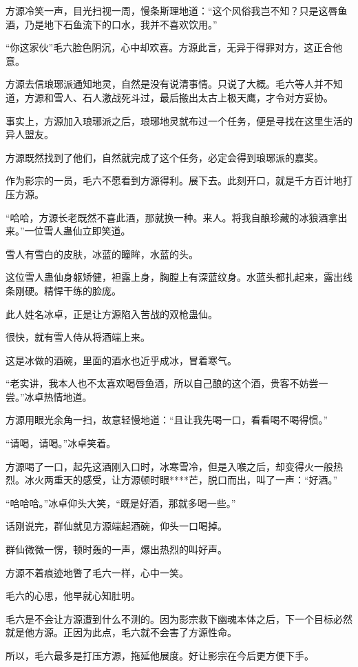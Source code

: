 \begin{this_body}
方源冷笑一声，目光扫视一周，慢条斯理地道：“这个风俗我岂不知？只是这唇鱼酒，乃是地下石鱼流下的口水，我并不喜欢饮用。”

“你这家伙”毛六脸色阴沉，心中却欢喜。方源此言，无异于得罪对方，这正合他意。

方源去信琅琊派通知地灵，自然是没有说清事情。只说了大概。毛六等人并不知道，方源和雪人、石人激战死斗过，最后搬出太古上极天鹰，才令对方妥协。

事实上，方源加入琅琊派之后，琅琊地灵就布过一个任务，便是寻找在这里生活的异人盟友。

方源既然找到了他们，自然就完成了这个任务，必定会得到琅琊派的嘉奖。

作为影宗的一员，毛六不愿看到方源得利。展下去。此刻开口，就是千方百计地打压方源。

“哈哈，方源长老既然不喜此酒，那就换一种。来人。将我自酿珍藏的冰狼酒拿出来。”一位雪人蛊仙立即笑道。

雪人有雪白的皮肤，冰蓝的瞳眸，水蓝的头。

这位雪人蛊仙身躯矫健，袒露上身，胸膛上有深蓝纹身。水蓝头都扎起来，露出线条刚硬。精悍干练的脸庞。

此人姓名冰卓，正是让方源陷入苦战的双枪蛊仙。

很快，就有雪人侍从将酒端上来。

这是冰做的酒碗，里面的酒水也近乎成冰，冒着寒气。

“老实讲，我本人也不太喜欢喝唇鱼酒，所以自己酿的这个酒，贵客不妨尝一尝。”冰卓热情地道。

方源用眼光余角一扫，故意轻慢地道：“且让我先喝一口，看看喝不喝得惯。”

“请喝，请喝。”冰卓笑着。

方源喝了一口，起先这酒刚入口时，冰寒雪冷，但是入喉之后，却变得火一般热烈。冰火两重天的感受，让方源顿时眼****芒，脱口而出，叫了一声：“好酒。”

“哈哈哈。”冰卓仰头大笑，“既是好酒，那就多喝一些。”

话刚说完，群仙就见方源端起酒碗，仰头一口喝掉。

群仙微微一愣，顿时轰的一声，爆出热烈的叫好声。

方源不着痕迹地瞥了毛六一样，心中一笑。

毛六的心思，他早就心知肚明。

毛六是不会让方源遭到什么不测的。因为影宗救下幽魂本体之后，下一个目标必然就是他方源。正因为此点，毛六就不会害了方源性命。

所以，毛六最多是打压方源，拖延他展度。好让影宗在今后更方便下手。


\end{this_body}
